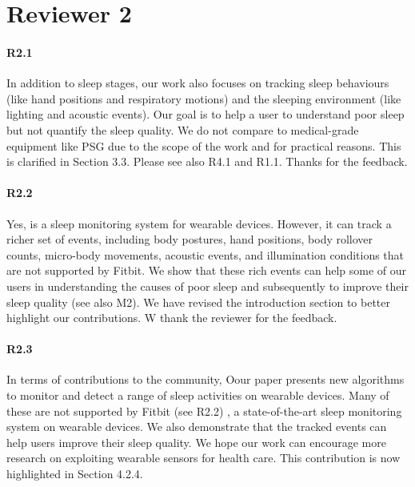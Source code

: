 \section*{Reviewer 2}
\paragraph{R2.1} In addition to sleep stages, our work also focuses on tracking sleep behaviours (like hand positions and respiratory motions) and the sleeping
environment (like lighting and acoustic events). Our goal is to help a user to understand poor sleep but not quantify the sleep quality. We
do not compare to medical-grade equipment like PSG due to the scope of the work and for practical reasons. This is clarified in
Section 3.3. Please see also R4.1 and R1.1. Thanks for the feedback.


\paragraph{R2.2} Yes, \systemname is a sleep monitoring system for wearable devices. However, it can track a richer set of events,
including body postures, hand positions, body rollover counts, micro-body movements, acoustic events, and illumination conditions that are
not supported by Fitbit. We show that these rich events can help some of our users in understanding the causes of poor sleep and
subsequently to improve their sleep quality (see also M2). We have revised the introduction section to better highlight our contributions.
W thank the reviewer for the feedback.

\paragraph{R2.3} In terms of contributions to the community, Oour paper presents new algorithms to monitor and detect a range of sleep
activities on wearable devices. Many of these are not supported by Fitbit (see R2.2) , a state-of-the-art sleep monitoring system on
wearable devices. We also demonstrate that the tracked events can help users improve their sleep quality. We hope our work can encourage
more research on exploiting wearable sensors for health care.   This contribution is now highlighted in Section 4.2.4.
